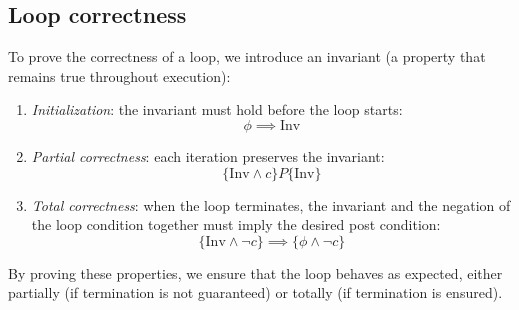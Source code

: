 \subsection{Loop correctness}
To prove the correctness of a loop, we introduce an invariant (a property that remains true throughout execution): 
\begin{enumerate}
    \item \textit{Initialization}: the invariant must hold before the loop starts:
        \[\phi\implies\text{Inv}\]
    \item \textit{Partial correctness}: each iteration preserves the invariant:
        \[\{ \text{Inv} \land c \} P \{ \text{Inv} \}\]
    \item \textit{Total correctness}: when the loop terminates, the invariant and the negation of the loop condition together must imply the desired post condition:
        \[\{ \text{Inv} \land \lnot c \} \implies \{ \phi\land\lnot c \}\]
\end{enumerate}
\noindent By proving these properties, we ensure that the loop behaves as expected, either partially (if termination is not guaranteed) or totally (if termination is ensured).
